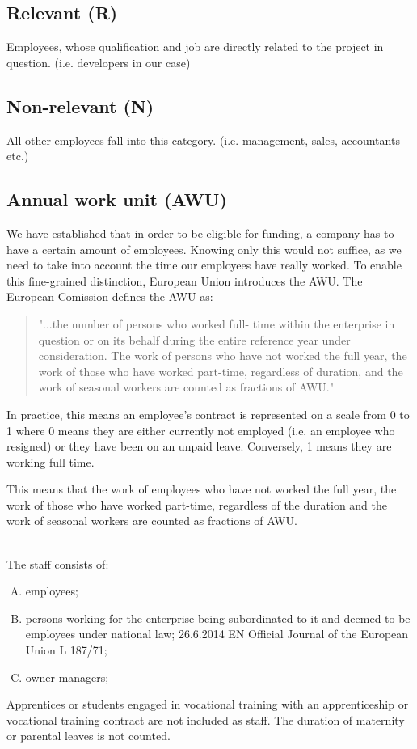 \documentclass[12pt,oneside]{fithesis2}
\begin{document}
\subsection*{Relevant (R)}
Employees, whose qualification and job are directly related to the project in question. (i.e. developers in our case)\cite[page~30]{czech-rules}
\subsection*{Non-relevant (N)}
All other employees fall into this category. (i.e. management, sales, accountants etc.)\cite[page~30]{czech-rules}
\subsection{Annual work unit (AWU)}
We have established that in order to be eligible for funding, a company has to have a certain amount of employees. Knowing only this would not suffice, as we need to take into account the time our employees have really worked. To enable this fine-grained distinction, European Union introduces the AWU.
\newline\newline
The European Comission defines the AWU as:
\blockquote{"...the number of persons who worked full- time within the enterprise in question or on its behalf during the entire reference year under consideration. The work of persons who have not worked the full year, the work of those who have worked part-time, regardless of duration, and the work of seasonal workers are counted as fractions of AWU."\cite[page~71]{eu-commision-regulation}}
\newpage
In practice, this means an employee's contract is represented on a scale from 0 to 1 where 0 means they are either currently not employed (i.e. an employee who resigned) or they have been on an unpaid leave. Conversely, 1 means they are working full time.

This means that the work of employees who have not worked the full year, the work of those who have worked part-time, regardless of the duration and the work of seasonal workers are counted as fractions of AWU.

~\\\newline
The staff consists of:
\begin{enumerate}[A)]
    \item employees;
    \item persons working for the enterprise being subordinated to it and deemed to be employees under national law; 26.6.2014 EN Official Journal of the European Union L 187/71;
    \item owner-managers;
\end{enumerate}
Apprentices or students engaged in vocational training with an apprenticeship or vocational training contract are not included as staff. The duration of maternity or parental leaves is not counted. \cite{eu-commision-regulation}
\end{document}
